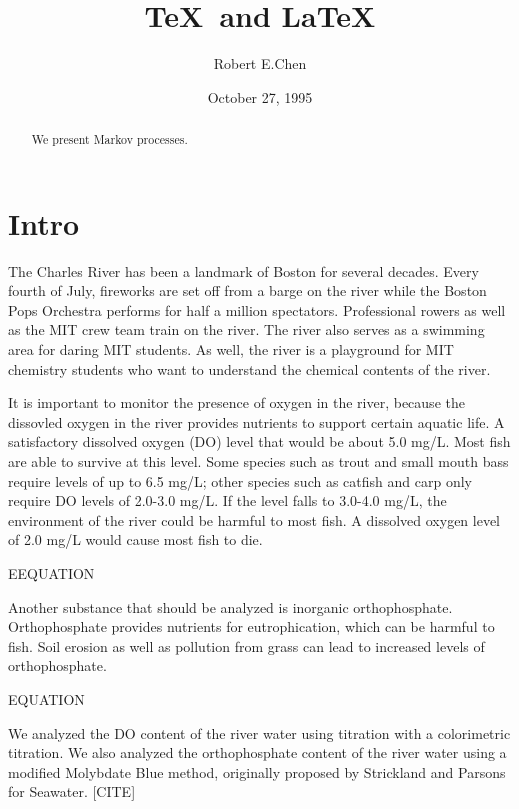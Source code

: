 \documentclass[]{article}   %
\begin{document}
\title{\TeX\ and \LaTeX}   %
\author{Robert E.Chen}         %
\date{October 27, 1995}    %
\maketitle

\begin{abstract}
  We present Markov processes.
\end{abstract}

\section{Intro}     %
The Charles River has been a landmark of Boston for several decades. Every fourth of July, fireworks are set off from a barge on the river while the Boston Pops Orchestra performs for half a million spectators.  Professional rowers as well as the MIT crew team train on the river. The river also serves as a swimming area for daring MIT students.  As well, the river is a playground for MIT chemistry students who want to understand the chemical contents of the river. 

It is important to monitor the presence of oxygen in the river, because the dissovled oxygen in the river provides nutrients to support certain aquatic life.  A satisfactory dissolved oxygen (DO) level that would be about 5.0 mg/L. Most fish are able to survive at this level. Some species such as trout and small mouth bass require levels of up to 6.5 mg/L; other species such as catfish and carp only require DO levels of 2.0-3.0 mg/L. If the level falls to 3.0-4.0 mg/L, the environment of the river could be harmful to most fish. A dissolved oxygen level of 2.0 mg/L would cause most fish to die. 

EEQUATION

	Another substance that should be analyzed is inorganic orthophosphate. Orthophosphate provides nutrients for eutrophication, which can be harmful to fish. Soil erosion as well as pollution from grass can lead to increased levels of orthophosphate. 

EQUATION 

	We analyzed the DO content of the river water using titration with a colorimetric titration. We also analyzed the orthophosphate content of the river water using a modified Molybdate Blue method, originally proposed by Strickland and Parsons for Seawater. [CITE]
\end{document}
